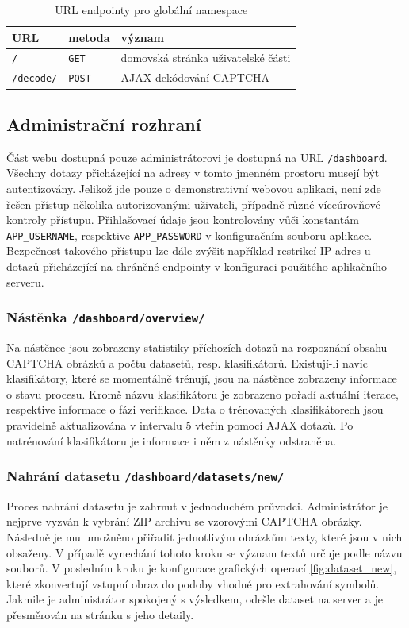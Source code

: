 \documentclass[
  field=ainfp,
  master=true,
  biblatex,
  sourcecodes=false,
  theorems=false,
  glossaries,
  index
]{kidiplom}
\begin{document}
\begin{table}[H]
\centering
\begin{tabular}{|l|l|l|}
\hline
\textbf{URL} & \textbf{metoda} & \textbf{význam}
\\ \hline
\texttt{/} & \texttt{GET} & domovská stránka uživatelské části
\\ \hline
\texttt{/decode/} & \texttt{POST} & AJAX dekódování CAPTCHA
\\ \hline
\end{tabular}
\caption{URL endpointy pro globální namespace}
\end{table}

\subsection{Administrační rozhraní}
Část webu dostupná pouze administrátorovi je dostupná na URL \texttt{/dashboard}. Všechny dotazy přicházející na adresy v tomto jmenném prostoru musejí být autentizovány. Jelikož jde pouze o demonstrativní webovou aplikaci, není zde řešen přístup několika autorizovanými uživateli, případně různé víceúrovňové kontroly přístupu. Přihlašovací údaje jsou kontrolovány vůči konstantám \texttt{APP\_USERNAME}, respektive \texttt{APP\_PASSWORD} v konfiguračním souboru aplikace. Bezpečnost ta\-ko\-vého přístupu lze dále zvýšit například restrikcí IP adres u dotazů přicházející na chráněné endpointy v konfiguraci použitého aplikačního serveru.

\subsubsection*{Nástěnka \texttt{/dashboard/overview/}}
 Na nástěnce jsou zobrazeny statistiky příchozích dotazů na rozpoznání obsahu CAPTCHA obrázků a počtu datasetů, resp. klasifikátorů. Existují-li navíc klasifikátory, které se momentálně trénují, jsou na nástěnce zobrazeny informace o stavu procesu. Kromě názvu klasifikátoru je zobrazeno pořadí aktuální iterace, respektive informace o fázi verifikace. Data o trénovaných klasifikátorech jsou pravidelně aktualizována v intervalu 5 vteřin pomocí AJAX dotazů. Po natrénování klasifikátoru je informace i něm z nástěnky odstraněna.

\subsubsection*{Nahrání datasetu \texttt{/dashboard/datasets/new/}}
Proces nahrání datasetu je zahrnut v jednoduchém průvodci. Administrátor je nejprve vyzván k vybrání ZIP archivu se vzorovými CAPTCHA obrázky. Následně je mu umožněno přiřadit jednotlivým obrázkům texty, které jsou v nich obsaženy. V případě vynechání tohoto kroku se význam textů určuje podle názvu souborů. V posledním kroku je konfigurace grafických operací \ref{fig:dataset_new}, které zkonvertují vstupní obraz do podoby vhodné pro extrahování symbolů. Jakmile je administrátor spokojený s výsledkem, odešle dataset na server a je přesměrován na stránku s jeho detaily.
\end{document}
